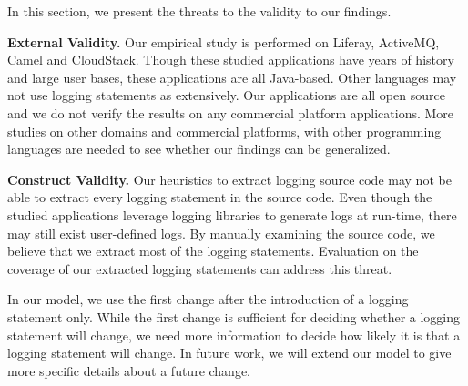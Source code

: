 In this section, we present the threats to the validity to our findings. 

\noindent \textbf{External Validity.} Our empirical study is performed on Liferay, ActiveMQ, Camel and CloudStack. Though these studied applications have years of history and large user bases, these applications are all Java-based. Other languages may not use logging statements as extensively. Our applications are all open source and we do not verify the results on any commercial platform applications. More studies on other domains and commercial platforms, with other programming languages are needed to see whether our findings can be generalized. 

\noindent \textbf{Construct Validity.} Our heuristics to extract logging source code may not be able to extract every logging statement in the source code. Even though the studied applications leverage logging libraries to generate logs at run-time, there may still exist user-defined logs. By manually examining the source code, we believe that we extract most of the logging statements. Evaluation on the coverage of our extracted logging statements can address this threat.

In our model, we use the first change after the introduction of a logging statement only. While the first change is sufficient for deciding whether a logging statement will change, we need more information to decide how likely it is that a logging statement will change. In future work, we will extend our model to give more specific details about a future change.



